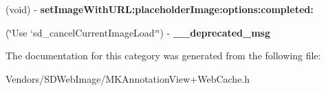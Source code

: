 \begin{DoxyCompactItemize}
\item 
\hypertarget{category_m_k_annotation_view_07_web_cache_deprecated_08_a83655962dcbf756271b6bb896b33f4b4}{}(void) -\/ {\bfseries set\+Image\+With\+U\+R\+L\+:placeholder\+Image\+:options\+:completed\+:}\label{category_m_k_annotation_view_07_web_cache_deprecated_08_a83655962dcbf756271b6bb896b33f4b4}

\item 
\hypertarget{category_m_k_annotation_view_07_web_cache_deprecated_08_af68f12dd068b67a2b0f4de5f1bbb8dee}{}(\char`\"{}Use `sd\+\_\+cancel\+Current\+Image\+Load`\char`\"{}) -\/ {\bfseries \+\_\+\+\_\+deprecated\+\_\+msg}\label{category_m_k_annotation_view_07_web_cache_deprecated_08_af68f12dd068b67a2b0f4de5f1bbb8dee}

\end{DoxyCompactItemize}


The documentation for this category was generated from the following file\+:\begin{DoxyCompactItemize}
\item 
Vendors/\+S\+D\+Web\+Image/M\+K\+Annotation\+View+\+Web\+Cache.\+h\end{DoxyCompactItemize}
